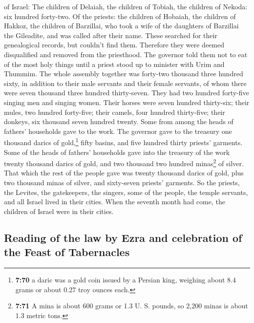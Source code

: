 of Israel:  The children of Delaiah, the children of
Tobiah, the children of Nekoda: six hundred forty-two. 
Of the priests: the children of Hobaiah, the children of Hakkoz, the
children of Barzillai, who took a wife of the daughters of Barzillai the
Gileadite, and was called after their name.  These
searched for their genealogical records, but couldn't find them.
Therefore they were deemed disqualified and removed from the priesthood.
 The governor told them not to eat of the most holy
things until a priest stood up to minister with Urim and Thummim.
 The whole assembly together was forty-two thousand three
hundred sixty,  in addition to their male servants and
their female servants, of whom there were seven thousand three hundred
thirty-seven. They had two hundred forty-five singing men and singing
women.  Their horses were seven hundred thirty-six; their
mules, two hundred forty-five;  their camels, four
hundred thirty-five; their donkeys, six thousand seven hundred twenty.
 Some from among the heads of fathers' households gave to
the work. The governor gave to the treasury one thousand darics of
gold,\footnote{\textbf{7:70} a daric was a gold coin issued by a Persian
  king, weighing about 8.4 grams or about 0.27 troy ounces each.} fifty
basins, and five hundred thirty priests' garments.  Some
of the heads of fathers' households gave into the treasury of the work
twenty thousand darics of gold, and two thousand two hundred
minas\footnote{\textbf{7:71} A mina is about 600 grams or 1.3 U. S.
  pounds, so 2,200 minas is about 1.3 metric tons.} of silver.
 That which the rest of the people gave was twenty
thousand darics of gold, plus two thousand minas of silver, and
sixty-seven priests' garments.  So the priests, the
Levites, the gatekeepers, the singers, some of the people, the temple
servants, and all Israel lived in their cities. When the seventh month
had come, the children of Israel were in their cities.

\hypertarget{reading-of-the-law-by-ezra-and-celebration-of-the-feast-of-tabernacles}{%
\subsection{Reading of the law by Ezra and celebration of the Feast of
Tabernacles}\label{reading-of-the-law-by-ezra-and-celebration-of-the-feast-of-tabernacles}}

